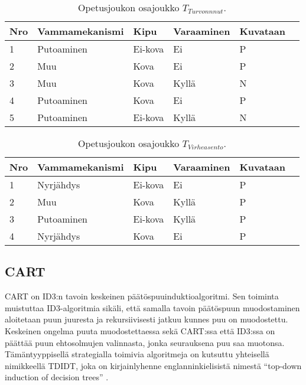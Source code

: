 \documentclass[12pt,finnish]{tktltiki2}
\theoremstyle{definition}
\theoremstyle{remark}
\begin{document}
\begin{table}
\centering
    \begin{tabular}{ | l | l | l | l | l | p{2cm} |} \hline
    \textbf{Nro} & \textbf{Vammamekanismi} & \textbf{Kipu} & \textbf{Varaaminen} & \textbf{Kuvataan} \\ \hline
    1 & Putoaminen & Ei-kova & Ei & P \\ \hline
    2 & Muu & Kova & Ei & P \\ \hline
    3 & Muu & Kova & Kyllä & N \\ \hline
    4 & Putoaminen & Kova & Ei & P \\ \hline
    5 & Putoaminen & Ei-kova & Kyllä & N \\ \hline
    \end{tabular}
\caption{Opetusjoukon osajoukko $T_{Turvonnnut}$.}
\label{table:OsajoukkoTTurvonnut}
\end{table}

\begin{table}
\centering
    \begin{tabular}{ | l | l | l | l | l | p{2cm} |} \hline
    \textbf{Nro} & \textbf{Vammamekanismi} & \textbf{Kipu} & \textbf{Varaaminen} & \textbf{Kuvataan} \\ \hline
    1 & Nyrjähdys & Ei-kova & Ei & P \\ \hline
    2 & Muu & Kova & Kyllä & P \\ \hline
    3 & Putoaminen & Ei-kova & Kyllä & P \\ \hline
    4 & Nyrjähdys & Kova & Ei & P \\ \hline
    \end{tabular}
\caption{Opetusjoukon osajoukko $T_{Virheasento}$.}
\label{table:OsajoukkoTVirheasento}
\end{table}





\subsection{CART}
CART \cite{CART} on ID3:n tavoin keskeinen päätöspuuinduktioalgoritmi. Sen toiminta muistuttaa ID3-algoritmia sikäli, että
samalla tavoin päätöspuun muodostaminen aloitetaan puun juuresta ja rekursiivisesti jatkuu kunnes puu on
muodostettu. Keskeinen ongelma puuta muodostettaessa sekä CART:ssa että ID3:ssa on päättää puun ehtosolmujen valinnasta,
jonka seurauksena puu saa muotonsa. Tämäntyyppisellä strategialla toimivia algoritmeja on kutsuttu yhteisellä nimikkeellä TDIDT, joka on
kirjainlyhenne englanninkielisistä nimestä ``top-down induction of decision trees'' \cite{quinlan}.
\end{document}
